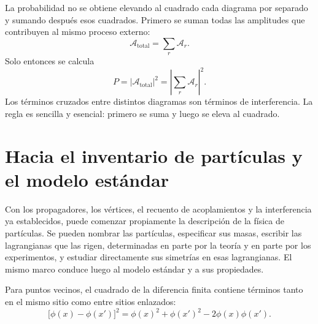 La probabilidad no se obtiene elevando al cuadrado cada diagrama por separado y sumando después esos cuadrados. Primero se suman todas las amplitudes que contribuyen al mismo proceso externo:
\begin{equation}
\mathcal{A}_{\mathrm{total}}=\sum_r\mathcal{A}_r.
\end{equation}
Solo entonces se calcula
\begin{equation}
P=\left|\mathcal{A}_{\mathrm{total}}\right|^2
=\left|\sum_r\mathcal{A}_r\right|^2.
\end{equation}
Los términos cruzados entre distintos diagramas son términos de interferencia. La regla es sencilla y esencial: primero se suma y luego se eleva al cuadrado.

\section{Hacia el inventario de partículas y el modelo estándar}

Con los propagadores, los vértices, el recuento de acoplamientos y la interferencia ya establecidos, puede comenzar propiamente la descripción de la física de partículas. Se pueden nombrar las partículas, especificar sus masas, escribir las lagrangianas que las rigen, determinadas en parte por la teoría y en parte por los experimentos, y estudiar directamente sus simetrías en esas lagrangianas. El mismo marco conduce luego al modelo estándar y a sus propiedades.

\begin{classroomqa}\end{classroomqa}

\begin{classroomqa}\end{classroomqa}

Para puntos vecinos, el cuadrado de la diferencia finita contiene términos tanto en el mismo sitio como entre sitios enlazados:
\begin{equation}
\bigl[\phi(x)-\phi(x')\bigr]^2
=
\phi(x)^2+\phi(x')^2-2\phi(x)\phi(x').
\end{equation}

\begin{classroomqa}\end{classroomqa}